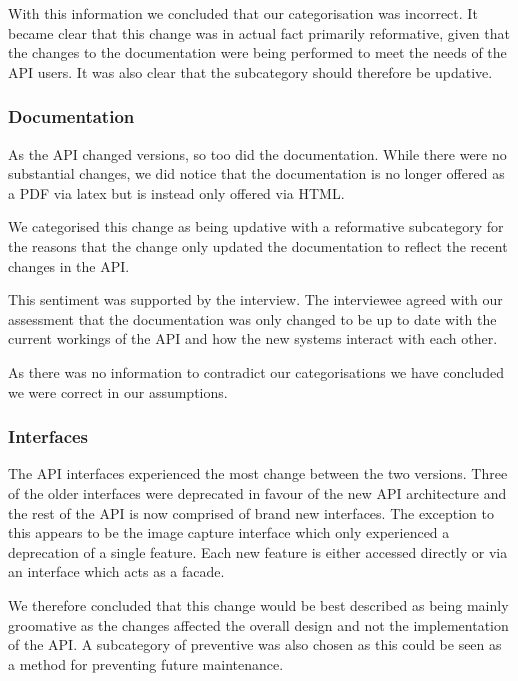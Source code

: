 \documentclass{sig-alternate}
\begin{document}
With this information we concluded that our categorisation was incorrect. It became clear that this change was in actual fact primarily reformative, given that the changes to the documentation were being performed to meet the needs of the API users. It was also clear that the subcategory should therefore be updative. 

\subsubsection{Documentation}

As the API changed versions, so too did the documentation. While there were no substantial changes, we did notice that the documentation is no longer offered as a PDF via latex but is instead only offered via HTML. 

We categorised this change as being updative with a reformative subcategory for the reasons that the change only updated the documentation to reflect the recent changes in the API.

This sentiment was supported by the interview. The interviewee agreed with our assessment that the documentation was only changed to be up to date with the current workings of the API and how the new systems interact with each other.

As there was no information to contradict our categorisations we have concluded we were correct in our assumptions.

\subsubsection{Interfaces}

The API interfaces experienced the most change between the two versions. Three of the older interfaces were deprecated in favour of the new API architecture and the rest of the API is now comprised of brand new interfaces. The exception to this appears to be the image capture interface which only experienced a deprecation of a single feature. Each new feature is either accessed directly or via an interface which acts as a facade. 

We therefore concluded that this change would be best described as being mainly groomative as the changes affected the overall design and not the implementation of the API. A subcategory of preventive was also chosen as this could be seen as a method for preventing future maintenance. 
\end{document}
